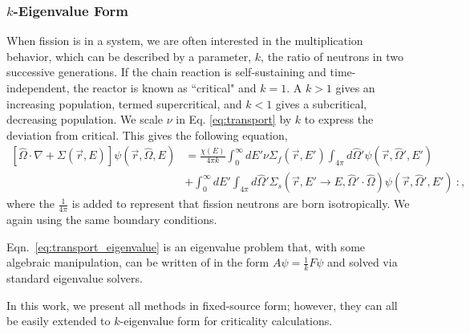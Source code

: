 \subsubsection{$k$-Eigenvalue Form}
When fission is in a system, we are often interested in the multiplication behavior, which can be described by a parameter, $k$, the ratio of neutrons in two successive generations. If the chain reaction is self-sustaining and time-independent, the reactor is known as ``critical" and $k=1$. A $k>1$ gives an increasing population, termed supercritical, and $k<1$ gives a subcritical, decreasing population. We scale $\nu$ in Eq. \eqref{eq:transport} by $k$ to express the deviation from critical. This gives the following equation,
%
\begin{equation}
    \label{eq:transport_eigenvalue}
    \begin{split}
        [\hat{\Omega} \cdot \nabla + \Sigma(\vec{r}, E)]\psi(\vec{r}, \hat{\Omega}, E) &= \frac{\chi(E)}{4\pi k} \int_0^\infty dE' \nu \Sigma_{f}(\vec{r}, E') \int_{4\pi} d\hat{\Omega}'\psi(\vec{r}, \hat{\Omega}', E') \\ &+ \int_0^\infty dE' \int_{4\pi} d\hat{\Omega}' \Sigma_s(\vec{r}, E' \rightarrow E, \hat{\Omega}' \cdot \hat{\Omega})\psi(\vec{r}, \hat{\Omega}', E') \ :,
    \end{split}
\end{equation}
where the $\frac{1}{4\pi}$ is added to represent that fission neutrons are born isotropically. We again using the same boundary conditions. 

Eqn.~\eqref{eq:transport_eigenvalue} is an eigenvalue problem that, with some algebraic manipulation, can be written of in the form $A\psi = \frac{1}{k} F\psi$ and solved via standard eigenvalue solvers. 

In this work, we present all methods in fixed-source form; however, they can all be easily extended to $k$-eigenvalue form for criticality calculations. 

